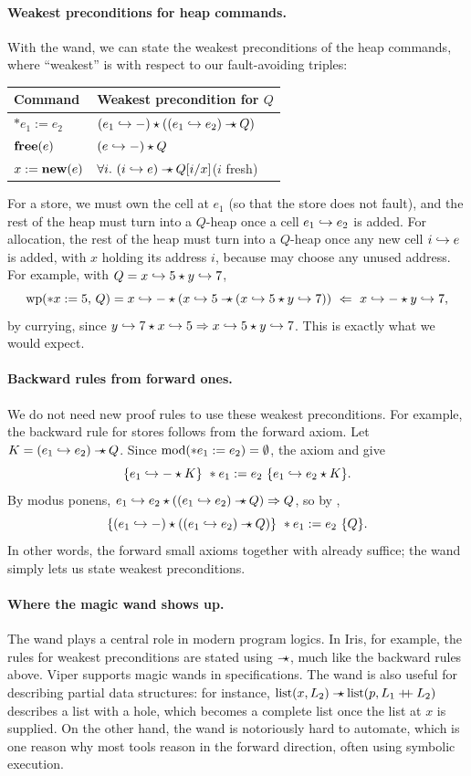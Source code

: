 \paragraph{Weakest preconditions for heap commands.} With the wand, we can state the weakest
preconditions of the heap commands, where ``weakest'' is with respect to our fault-avoiding
triples:
\begin{center}
\begin{tabular}{ll}
  \textbf{Command} & \textbf{Weakest precondition for $Q$}\\\hline
  $\ast e_1:=e_2$ & $(e_1\hookrightarrow-)\mathbin{\star}((e_1\hookrightarrow e_2)\mathbin{-\!\!\star} Q)$\\
  $\mathbf{free}(e)$ & $(e\hookrightarrow-)\mathbin{\star} Q$\\
  $x:=\mathbf{new}(e)$ & $\forall i.\ (i\pto e)\wand Q[i/x]$\quad($i$ fresh)
\end{tabular}
\end{center}
For a store, we must own the cell at $e_1$ (so that the store does not fault), and the rest of the
heap must turn into a $Q$-heap once a cell $e_1\hookrightarrow e_2$ is added. For allocation, the rest of the
heap must turn into a $Q$-heap once any new cell $i\hookrightarrow e$ is added, with $x$ holding its address
$i$, because  may choose any unused address. For example, with
$Q=x\hookrightarrow 5\mathbin{\star} y\hookrightarrow 7$,
\[
  \mathrm{wp}(\ast x:=5,\,Q)=x\hookrightarrow-\mathbin{\star}(x\hookrightarrow 5\mathbin{-\!\!\star}(x\hookrightarrow 5\mathbin{\star} y\hookrightarrow 7))\ \Leftarrow\ x\hookrightarrow-\mathbin{\star} y\hookrightarrow 7,
\]
by currying, since $y\hookrightarrow 7\mathbin{\star} x\hookrightarrow 5\Rightarrow x\hookrightarrow 5\mathbin{\star} y\hookrightarrow 7$. This is exactly what we
would expect.

\paragraph{Backward rules from forward ones.} We do not need new proof rules to use these weakest
preconditions. For example, the backward rule for stores follows from the forward 
axiom. Let $K=(e_1\hookrightarrow e_2)\mathbin{-\!\!\star} Q$. Since $\mathrm{mod}(\ast e_1:=e_2)=\emptyset$, the  axiom
and  give
\[
  \{e_1\hookrightarrow-\mathbin{\star} K\}\ \ast e_1:=e_2\ \{e_1\hookrightarrow e_2\mathbin{\star} K\}.
\]
By modus ponens, $e_1\hookrightarrow e_2\mathbin{\star}((e_1\hookrightarrow e_2)\mathbin{-\!\!\star} Q)\Rightarrow Q$, so by ,
\[
  \{(e_1\hookrightarrow-)\mathbin{\star}((e_1\hookrightarrow e_2)\mathbin{-\!\!\star} Q)\}\ \ast e_1:=e_2\ \{Q\}.
\]
In other words, the forward small axioms together with  already suffice; the wand simply
lets us state weakest preconditions.

\paragraph{Where the magic wand shows up.} The wand plays a central role in modern program logics.
In Iris, for example, the rules for weakest preconditions are stated using $\mathbin{-\!\!\star}$, much like the
backward rules above. Viper supports magic wands in specifications. The wand is also useful for
describing partial data structures: for instance, $\mathrm{list}(x,L_2)\mathbin{-\!\!\star}\mathrm{list}(p,L_1\mathbin{+\!\!+} L_2)$ describes
a list with a hole, which becomes a complete list once the list at $x$ is supplied. On the other
hand, the wand is notoriously hard to automate, which is one reason why most tools reason in the
forward direction, often using symbolic execution.

